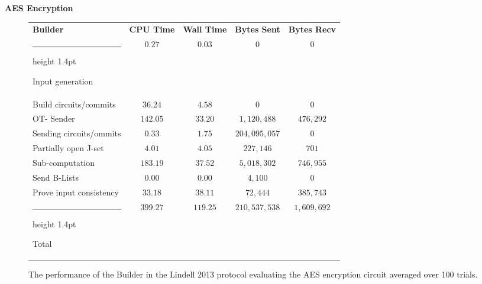 \documentclass[11pt]{article} %
\makeatletter
\newcommand{\thickhline}{%
    \noalign {\ifnum 0=`}\fi \hrule height 1.4pt
    \futurelet \reserved@a \@xhline
}
\makeatother
\begin{document}
				\FloatBarrier
				\noindent \textbf{AES Encryption}
				\begin{figure}[!ht]
					\begin{tabular}{| p{4.3cm} | c c c c |}
						\hline
						\textbf{Builder} & \textbf{CPU Time} & \textbf{Wall Time} & \textbf{Bytes Sent} & \textbf{Bytes Recv} \\
						\thickhline
						Input generation & $0.27$ & $0.03$ & $0$ & $0$ \\
						\hline
						Build circuits/commits & $36.24$ & $4.58$ & $0$ & $0$ \\
						\hline
						OT- Sender & $142.05$ & $33.20$ & $1,120,488$ & $476,292$ \\
						\hline
						Sending circuits/ommits & $0.33$ & $1.75$ & $204,095,057$ & $0$ \\
						\hline
						Partially open J-set & $4.01$ & $4.05$ & $227,146$ & $701$ \\
						\hline
						Sub-computation & $183.19$ & $37.52$ & $5,018,302$ & $746,955$ \\
						\hline
						Send B-Lists & $0.00$ & $0.00$ & $4,100$ & $0$ \\
						\hline
						Prove input consistency & $33.18$ & $38.11$ & $72,444$ & $385,743$ \\
						\thickhline
						Total & $399.27$ & $119.25$ & $210,537,538$ & $1,609,692$ \\
						\hline
					\end{tabular}
					\caption{The performance of the Builder in the Lindell 2013 protocol evaluating the AES encryption circuit averaged over 100 trials. \label{table:L_2013_AES_Builder}}
				\end{figure}
\end{document}
